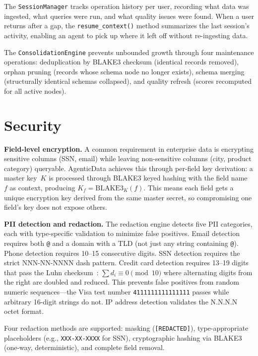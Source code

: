 \documentclass[10pt, twocolumn]{article}
\begin{document}
The \texttt{SessionManager} tracks operation history per user, recording what data was ingested, what queries were run, and what quality issues were found. When a user returns after a gap, the \texttt{resume\_context()} method summarizes the last session's activity, enabling an agent to pick up where it left off without re-ingesting data.

The \texttt{ConsolidationEngine} prevents unbounded growth through four maintenance operations: deduplication by BLAKE3 checksum (identical records removed), orphan pruning (records whose schema node no longer exists), schema merging (structurally identical schemas collapsed), and quality refresh (scores recomputed for all active nodes).


\section{Security}\label{sec:security}

\textbf{Field-level encryption.} A common requirement in enterprise data is encrypting sensitive columns (SSN, email) while leaving non-sensitive columns (city, product category) queryable. AgenticData achieves this through per-field key derivation: a master key~$K$ is processed through BLAKE3 keyed hashing with the field name~$f$ as context, producing $K_f = \text{BLAKE3}_K(f)$. This means each field gets a unique encryption key derived from the same master secret, so compromising one field's key does not expose others.

\textbf{PII detection and redaction.} The redaction engine detects five PII categories, each with type-specific validation to minimize false positives. Email detection requires both \texttt{@} and a domain with a TLD (not just any string containing \texttt{@}). Phone detection requires 10--15 consecutive digits. SSN detection requires the strict NNN-NN-NNNN dash pattern. Credit card detection requires 13--19 digits that pass the Luhn checksum~\cite{luhn1960computer}: $\sum d_i \equiv 0 \pmod{10}$ where alternating digits from the right are doubled and reduced. This prevents false positives from random numeric sequences---the Visa test number \texttt{4111111111111111} passes while arbitrary 16-digit strings do not. IP address detection validates the N.N.N.N octet format.

Four redaction methods are supported: masking (\texttt{[REDACTED]}), type-appropriate placeholders (e.g., \texttt{XXX-XX-XXXX} for SSN), cryptographic hashing via BLAKE3 (one-way, deterministic), and complete field removal.
\end{document}
